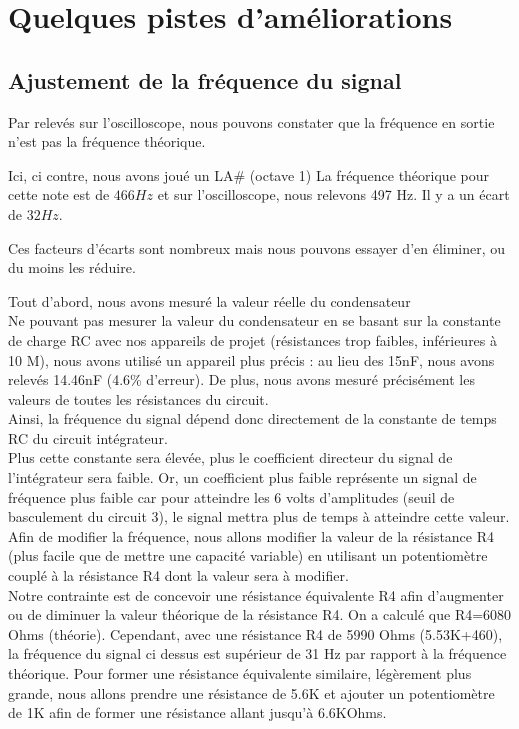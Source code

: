 
\chapter{Quelques pistes d’améliorations}
\section{Ajustement de la fréquence du signal}

Par relevés sur l’oscilloscope, nous pouvons constater que la fréquence en sortie n’est pas la fréquence théorique. 


Ici, ci contre, nous avons joué un LA\# (octave 1)
La fréquence théorique pour cette note est de $466 Hz$ et sur l’oscilloscope, nous relevons 497 Hz. Il y a un écart de $32 Hz$.




Ces facteurs d’écarts sont nombreux mais nous pouvons essayer d’en éliminer, ou du moins les réduire. 

Tout d’abord, nous avons mesuré la valeur réelle du condensateur \\
Ne pouvant pas mesurer la valeur du condensateur en se basant sur la constante de charge RC avec nos appareils de projet (résistances trop faibles, inférieures à 10 M), nous avons utilisé un appareil plus précis : au lieu des 15nF, nous avons relevés 14.46nF (4.6\% d’erreur).
De plus, nous avons mesuré précisément les valeurs de toutes les résistances du circuit.\\

Ainsi, la fréquence du signal dépend donc directement de la constante de temps RC du circuit intégrateur. \\
Plus cette constante sera élevée, plus le coefficient directeur du signal de l’intégrateur sera faible.
Or, un coefficient plus faible représente un signal de fréquence plus faible car pour atteindre les 6 volts d’amplitudes (seuil de basculement du circuit 3), 
le signal mettra plus de temps à atteindre cette valeur.\\


Afin de modifier la fréquence, nous allons modifier la valeur de la résistance R4 (plus facile que de mettre une capacité variable) en utilisant un potentiomètre couplé à la résistance R4 dont la valeur sera à modifier.\\



Notre contrainte est de concevoir une résistance équivalente R4 afin d’augmenter ou de diminuer la valeur théorique de la résistance R4. 
On a calculé que R4=6080 Ohms (théorie).
Cependant, avec une résistance R4 de 5990 Ohms (5.53K+460), la fréquence du signal ci dessus est supérieur de 31 Hz par rapport à la fréquence théorique.
Pour former une résistance équivalente similaire, légèrement plus grande, nous allons prendre une résistance de 5.6K et ajouter un potentiomètre de 1K afin de former une résistance allant jusqu’à 6.6KOhms.

